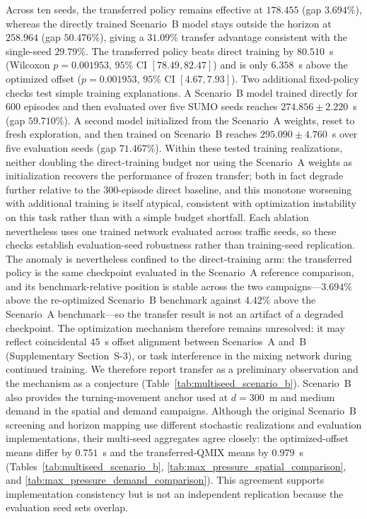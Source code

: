 \documentclass[review,12pt]{elsarticle}
\begin{document}
Across ten seeds, the transferred policy remains effective at $178.455$ (gap $3.694\%$), whereas the directly trained Scenario~B model stays outside the horizon at $258.964$ (gap $50.476\%$), giving a $31.09\%$ transfer advantage consistent with the single-seed $29.79\%$. The transferred policy beats direct training by $80.510$~s (Wilcoxon $p=0.001953$, $95\%$ CI $[78.49, 82.47]$) and is only $6.358$~s above the optimized offset ($p=0.001953$, $95\%$ CI $[4.67, 7.93]$). Two additional fixed-policy checks test simple training explanations.
A Scenario~B model trained directly for $600$ episodes and then evaluated
over five SUMO seeds reaches $274.856\pm2.220$~s (gap $59.710\%$).
A second model initialized from the Scenario~A weights, reset to fresh
exploration, and then trained on Scenario~B reaches
$295.090\pm4.760$~s over five evaluation seeds (gap $71.467\%$).
Within these tested training realizations, neither doubling the direct-training
budget nor using the Scenario~A weights as initialization recovers the
performance of frozen transfer; both in fact degrade further relative to the
$300$-episode direct baseline, and this monotone worsening with additional
training is itself atypical, consistent with optimization instability on this
task rather than with a simple budget shortfall. Each ablation nevertheless uses one trained
network evaluated across traffic seeds, so these checks establish
evaluation-seed robustness rather than training-seed replication.
The anomaly is nevertheless confined to the direct-training arm: the transferred policy is the same checkpoint evaluated in the Scenario~A reference comparison, and its benchmark-relative position is stable across the two campaigns---$3.694\%$ above the re-optimized Scenario~B benchmark against $4.42\%$ above the Scenario~A benchmark---so the transfer result is not an artifact of a degraded checkpoint. The optimization mechanism therefore remains unresolved: it may reflect coincidental $45$~s offset alignment between Scenarios~A and~B (Supplementary Section~S-3), or task interference in the mixing network during continued training. We therefore report transfer as a preliminary observation and the mechanism as a conjecture (Table~\ref{tab:multiseed_scenario_b}).
Scenario~B also provides the turning-movement anchor used at
$d=300$~m and medium demand in the spatial and demand campaigns.
Although the original Scenario~B screening and horizon mapping use
different stochastic realizations and evaluation implementations, their
multi-seed aggregates agree closely: the optimized-offset means differ
by $0.751$~s and the transferred-QMIX means by $0.979$~s
(Tables~\ref{tab:multiseed_scenario_b},
\ref{tab:max_pressure_spatial_comparison}, and
\ref{tab:max_pressure_demand_comparison}). This agreement supports
implementation consistency but is not an independent replication
because the evaluation seed sets overlap.
\end{document}
